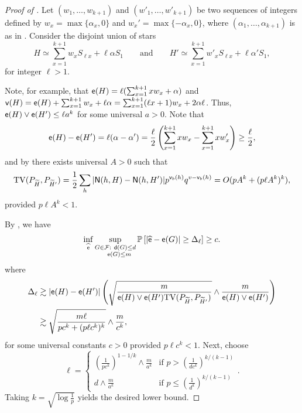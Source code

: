 \begin{proof}[Proof of ]
Let $ (w_1, \dots, w_{k+1}) $ and $ (w'_1, \dots, w'_{k+1}) $ be two sequences of integers defined by 
$w_x=\max\{\alpha_x,0\}$ and $w_x'=\max\{-\alpha_x,0\}$, where $ (\alpha_1, \dots, \alpha_{k+1}) $ is as in . 
Consider the disjoint union of stars
\begin{equation*}
H \simeq \sum_{x=1}^{k+1} w_x S_{\ell x} + \ell\alpha S_1 \qquad \text{and} \qquad  H' \simeq \sum_{x=1}^{k+1} w'_x S_{\ell x} + \ell\alpha'  S_1,
\end{equation*}
for integer $ \ell > 1 $.

Note, for example, that $ {\mathsf{e}}(H) = \ell(\sum_{x=1}^{k+1} xw_x + \alpha) $ and $ {\mathsf{v}}(H) = {\mathsf{e}}(H) + \sum_{x=1}^{k+1} w_x + \ell\alpha = \sum_{x=1}^{k+1} (\ell x+1)w_x + 2\alpha \ell $. Thus, $ {\mathsf{e}}(H) \vee {\mathsf{e}}(H') \leq \ell a^k $ for some universal $ a > 0 $. Note that
\begin{equation*}
{\mathsf{e}}(H) - {\mathsf{e}}(H') = \ell(\alpha - \alpha') = \frac{\ell}{2}\left(\sum_{x=1}^{k+1} xw_x - \sum_{x=1}^{k+1} xw'_x\right) \geq \frac{\ell}{2},
\end{equation*}
and by  there exists universal $ A > 0 $ such that
\begin{equation*}
{\rm TV}(P_{{\widetilde{H}}}, P_{{\widetilde{H}}'}) = \frac{1}{2}\sum_h | {\mathsf{N}}(h, H) - {\mathsf{N}}(h, H') |p^{{\mathsf{v}}_b(h)}q^{v-{\mathsf{v}}_b(h)} = O(pA^k + (p\ell A^k)^k),
\end{equation*}
provided $ p\ell A^k < 1 $.

By , we have
\begin{equation*}
\inf_{\widehat{{\mathsf{e}}}}\sup_{\substack{G \in {\mathcal{F}}: ~{\mathsf{d}}(G)\leq d\\ ~~~{\mathsf{e}}(G) \leq m}}\mathbb{P}\left[|\widehat{{\mathsf{e}}}-{\mathsf{e}}(G)| \geq \Delta_{\ell} \right] \geq c.
\end{equation*}
where
\begin{align*}
\Delta_{\ell} & \gtrsim |{\mathsf{e}}(H) - {\mathsf{e}}(H')| \left(\sqrt{ \frac{m}{{\mathsf{e}}(H) \vee {\mathsf{e}}(H') {\rm TV}(P_{{\widetilde{H}}}, P_{{\widetilde{H}}'})}} \wedge \frac{m}{{\mathsf{e}}(H) \vee {\mathsf{e}}(H')} \right) \\ & \gtrsim \sqrt{ \frac{m \ell}{pc^k + (p\ell c^k)^{k}}} \wedge \frac{m}{c^k},
\end{align*}
for some universal constants $ c > 0 $ provided $ p\ell c^k < 1 $. Next, choose
\begin{equation}
\ell =
\begin{cases}
    \left(\frac{1}{pc^k}\right)^{1-1/k} \wedge \frac{m}{a^k} & \text{if } p > \left(\frac{1}{dc^k}\right)^{k/(k-1)} \\
    d \wedge \frac{m}{a^k} & \text{if } p \leq \left(\frac{1}{d^k}\right)^{k/(k-1)}
  \end{cases}.
\end{equation}
Taking $ k = \sqrt{\log\frac{1}{p}} $ yields the desired lower bound.
\end{proof}

